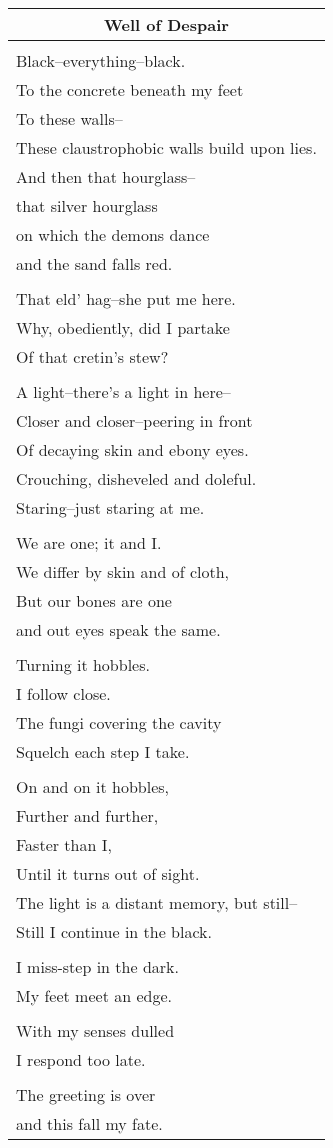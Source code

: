\documentclass{article}
\begin{document}
\begin{center}
\begin{tabular}{l}
\multicolumn{1}{c}{\textbf{Well of Despair}} \\ \hline
\\
Black--everything--black. \\
To the concrete beneath my feet \\
To these walls-- \\
These claustrophobic walls build upon lies. \\
And then that hourglass-- \\
that silver hourglass \\
on which the demons dance \\
and the sand falls red. \\
\\
That eld' hag--she put me here. \\
Why, obediently, did I partake \\
Of that cretin's stew? \\
\\
A light--there's a light in here-- \\
Closer and closer--peering in front \\
Of decaying skin and ebony eyes. \\
Crouching, disheveled and doleful. \\
Staring--just staring at me. \\
\\
We are one; it and I. \\
We differ by skin and of cloth, \\
But our bones are one \\
and out eyes speak the same. \\
\\
Turning it hobbles. \\
I follow close. \\
The fungi covering the cavity \\
Squelch each step I take. \\
\\
On and on it hobbles, \\
Further and further, \\
Faster than I, \\
Until it turns out of sight. \\
The light is a distant memory, but still-- \\
Still I continue in the black. \\
\\
I miss-step in the dark. \\
My feet meet an edge. \\
\\
With my senses dulled \\
I respond too late. \\
\\
The greeting is over \\
and this fall my fate. \\
\end{tabular}
\end{center}
\end{document}
